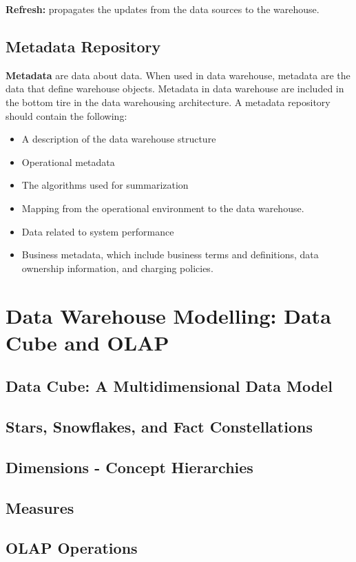 			{\bf Refresh:} propagates the updates from the data sources to the warehouse. 

	\subsection{Metadata Repository}

		{\bf Metadata} are data about data. When used in data warehouse, metadata are the
		data that define warehouse objects. Metadata in data warehouse are included in the
		bottom tire in the data warehousing architecture. A metadata repository should 
		contain the following:

			\begin{itemize}
				\item A description of the data warehouse structure
				\item Operational metadata
				\item The algorithms used for summarization
				\item Mapping from the operational environment to the data warehouse.
				\item Data related to system performance
				\item Business metadata, which include business terms and definitions, data
				ownership information, and charging policies.  
			\end{itemize}

\section{Data Warehouse Modelling: Data Cube and OLAP}
	
	\subsection{Data Cube: A Multidimensional Data Model}

	\subsection{Stars, Snowflakes, and Fact Constellations}

	\subsection{Dimensions - Concept Hierarchies}

	\subsection{Measures}

	\subsection{OLAP Operations}